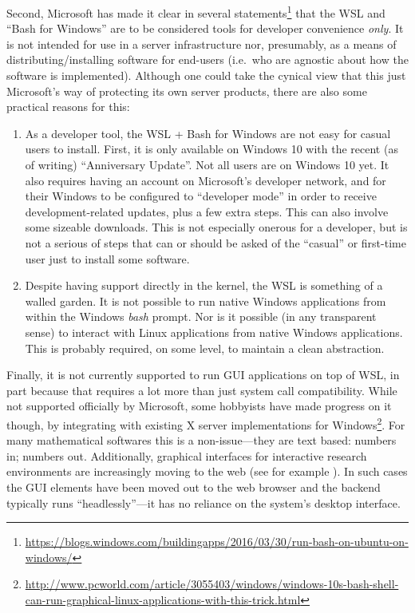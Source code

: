 \documentclass{deliverablereport}
\begin{document}
Second, Microsoft has made it clear in several
statements\footnote{\url{https://blogs.windows.com/buildingapps/2016/03/30/run-bash-on-ubuntu-on-windows/}}
that the WSL and ``Bash for Windows'' are to be considered tools for
developer convenience \emph{only}.  It is not intended for use in a
server infrastructure nor, presumably, as a means of
distributing/installing software for end-users (i.e.\ who are agnostic
about how the software is implemented).  Although one could take the
cynical view that this just Microsoft's way of protecting its own
server products, there are also some practical reasons for this:

\begin{enumerate}
\item As a developer tool, the WSL + Bash for Windows are not easy for
  casual users to install.  First, it is only available on Windows 10
  with the recent (as of writing) ``Anniversary Update''.  Not all
  users are on Windows 10 yet.  It also requires having an account on
  Microsoft's developer network, and for their Windows to be
  configured to ``developer mode'' in order to receive
  development-related updates, plus a few extra steps.  This can also
  involve some sizeable downloads.  This is not especially onerous for
  a developer, but is not a serious of steps that can or should be
  asked of the ``casual'' or first-time user just to install some
  software.
\item Despite having support directly in the kernel, the WSL is
  something of a walled garden.  It is not possible to run native
  Windows applications from within the Windows \emph{bash} prompt.
  Nor is it possible (in any transparent sense) to interact with Linux
  applications from native Windows applications.  This is probably
  required, on some level, to maintain a clean abstraction.
\end{enumerate}

Finally, it is not currently supported to run GUI applications on top
of WSL, in part because that requires a lot more than just system call
compatibility.  While not supported officially by Microsoft, some
hobbyists have made progress on it though, by integrating with
existing X server implementations for
Windows\footnote{\url{http://www.pcworld.com/article/3055403/windows/windows-10s-bash-shell-can-run-graphical-linux-applications-with-this-trick.html}}.
For many mathematical softwares this is a non-issue---they are text
based: numbers in; numbers out.  Additionally, graphical interfaces
for interactive research environments are increasingly moving to the
web (see for example
\href{http://opendreamkit.org/activities/2016-08-30_SMC}{\SMC}).  In
such cases the GUI elements have been moved out to the web browser and
the backend typically runs ``headlessly''---it has no reliance on the
system's desktop interface.
\end{document}
